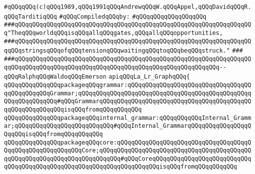 \label{src/app/yacc/src/la-lr-graph.api}
\verb|#qQQqqQQq(c)qQQq1989,qQQq1991qQQqAndrewqQQqW.qQQqAppel,qQQqDavidqQQqR.qQQqTarditiqQQq|\newline
\newline
\verb|#qQQqCompiledqQQqby:|\newline
\verb|#qQQqqQQqqQQqqQQqqQQq|\newline
\newline
\newline
\newline
\verb|###qQQqqQQqqQQqqQQqqQQqqQQqqQQqqQQqqQQqqQQqqQQqqQQqqQQqqQQqqQQqqQQqqQQq"TheqQQqworldqQQqisqQQqallqQQqgates,qQQqallqQQqopportunities,|\newline
\verb|###qQQqqQQqqQQqqQQqqQQqqQQqqQQqqQQqqQQqqQQqqQQqqQQqqQQqqQQqqQQqqQQqqQQqqQQqstringsqQQqofqQQqtensionqQQqwaitingqQQqtoqQQqbeqQQqstruck."|\newline
\verb|###|\newline
\verb|###qQQqqQQqqQQqqQQqqQQqqQQqqQQqqQQqqQQqqQQqqQQqqQQqqQQqqQQqqQQqqQQqqQQqqQQqqQQqqQQqqQQqqQQqqQQqqQQqqQQqqQQqqQQqqQQqqQQqqQQqqQQqqQQq--qQQqRalphqQQqWaldoqQQqEmerson|\newline
\newline
\newline
\newline
\verb|apiqQQqLa_Lr_GraphqQQq{|\newline
\newline
\verb|qQQqqQQqqQQqqQQqpackageqQQqgrammar:qQQqqQQqqQQqqQQqqQQqqQQqqQQqqQQqqQQqqQQqqQQqqQQqGrammar;qQQqqQQqqQQqqQQqqQQqqQQqqQQqqQQqqQQqqQQqqQQqqQQqqQQqqQQqqQQqqQQq#qQQqGrammarqQQqqQQqqQQqqQQqqQQqqQQqqQQqqQQqqQQqqQQqqQQqqQQqqQQqqQQqqQQqisqQQqfromqQQqqQQqqQQq|\newline
\verb|qQQqqQQqqQQqqQQqpackageqQQqinternal_grammar:qQQqqQQqqQQqInternal_Grammar;qQQqqQQqqQQqqQQqqQQqqQQqqQQq#qQQqInternal_GrammarqQQqqQQqqQQqqQQqqQQqqQQqisqQQqfromqQQqqQQqqQQq|\newline
\verb|qQQqqQQqqQQqqQQqpackageqQQqcore:qQQqqQQqqQQqqQQqqQQqqQQqqQQqqQQqqQQqqQQqqQQqqQQqqQQqqQQqqQQqCore;qQQqqQQqqQQqqQQqqQQqqQQqqQQqqQQqqQQqqQQqqQQqqQQqqQQqqQQqqQQqqQQqqQQqqQQqqQQq#qQQqCoreqQQqqQQqqQQqqQQqqQQqqQQqqQQqqQQqqQQqqQQqqQQqqQQqqQQqqQQqqQQqqQQqqQQqqQQqisqQQqfromqQQqqQQqqQQq|\newline
